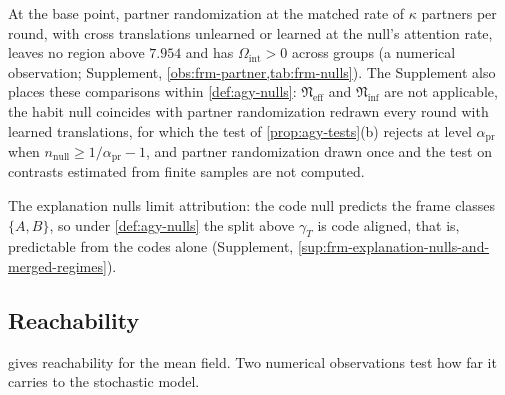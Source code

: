 At the base point, partner randomization at the matched rate of $\kappa$ partners per round, with cross translations unlearned or learned at the null's attention rate, leaves no region above $7.954$ and has $\Omega_{\mathrm{int}}>0$ across groups (a numerical observation; Supplement, \cref{obs:frm-partner,tab:frm-nulls}). The Supplement also places these comparisons within \cref{def:agy-nulls}: $\mathfrak N_{\mathrm{eff}}$ and $\mathfrak N_{\mathrm{inf}}$ are not applicable, the habit null coincides with partner randomization redrawn every round with learned translations, for which the test of \cref{prop:agy-tests}(b) rejects at level $\alpha_{\mathrm{pr}}$ when $n_{\mathrm{null}}\ge1/\alpha_{\mathrm{pr}}-1$, and partner randomization drawn once and the test on contrasts estimated from finite samples are not computed.

The explanation nulls limit attribution: the code null predicts the frame classes $\{A,B\}$, so under \cref{def:agy-nulls} the split above $\gamma_T$ is code aligned, that is, predictable from the codes alone (Supplement, \cref{sup:frm-explanation-nulls-and-merged-regimes}).

\subsection{Reachability}\label{sec:frm-reach}

 gives reachability for the mean field. Two numerical observations test how far it carries to the stochastic model.

